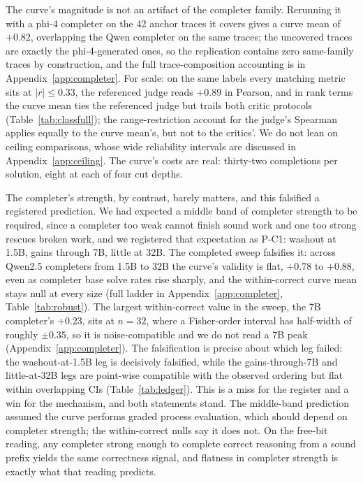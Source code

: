 The curve's magnitude is not an artifact of the completer family.
Rerunning it with a phi-4 completer on the 42 anchor traces it covers gives a curve mean of $+0.82$, overlapping the Qwen completer on the same traces; the uncovered traces are exactly the phi-4-generated ones, so the replication contains zero same-family traces by construction, and the full trace-composition accounting is in Appendix~\ref{app:completer}.
For scale: on the same labels every matching metric sits at $|r| \le 0.33$, the referenced judge reads $+0.89$ in Pearson, and in rank terms the curve mean ties the referenced judge but trails both critic protocols (Table~\ref{tab:classfull}); the range-restriction account for the judge's Spearman applies equally to the curve mean's, but not to the critics'.
We do not lean on ceiling comparisons, whose wide reliability intervals are discussed in Appendix~\ref{app:ceiling}.
The curve's costs are real: thirty-two completions per solution, eight at each of four cut depths.

The completer's strength, by contrast, barely matters, and this falsified a registered prediction.
We had expected a middle band of completer strength to be required, since a completer too weak cannot finish sound work and one too strong rescues broken work, and we registered that expectation as P-C1: washout at 1.5B, gains through 7B, little at 32B.
The completed sweep falsifies it: across Qwen2.5 completers from 1.5B to 32B the curve's validity is flat, $+0.78$ to $+0.88$, even as completer base solve rates rise sharply, and the within-correct curve mean stays null at every size (full ladder in Appendix~\ref{app:completer}, Table~\ref{tab:robust}).
The largest within-correct value in the sweep, the 7B completer's $+0.23$, sits at $n{=}32$, where a Fisher-order interval has half-width of roughly $\pm 0.35$, so it is noise-compatible and we do not read a 7B peak (Appendix~\ref{app:completer}).
The falsification is precise about which leg failed: the washout-at-1.5B leg is decisively falsified, while the gains-through-7B and little-at-32B legs are point-wise compatible with the observed ordering but flat within overlapping CIs (Table~\ref{tab:ledger}).
This is a miss for the register and a win for the mechanism, and both statements stand.
The middle-band prediction assumed the curve performs graded process evaluation, which should depend on completer strength; the within-correct nulls say it does not.
On the free-bit reading, any completer strong enough to complete correct reasoning from a sound prefix yields the same correctness signal, and flatness in completer strength is exactly what that reading predicts.

